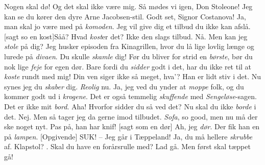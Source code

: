 \documentclass[a4paper,11pt]{article}
\begin{document}
  \begin{sketch}


     Nogen skal dø! Og det skal ikke være mig.
     Så mødes vi igen, Don Stoleone! Jeg kan se du kører den dyre Arne Jacobsen-stil.
     Godt set, Signor Costanova! Ja, man skal jo være med på \emph{komoden}. Jeg vil give dig et tilbud du ikke kan afslå.
    [sagt so en kost]Såå? Hvad \emph{kost}er det?
    Ikke den slags tilbud.
    Nå. Men kan jeg \emph{stole} på dig? Jeg husker episoden fra Kinagrillen, hvor du lå lige lovlig længe og lurede på \emph{divaen}. Du skulle \emph{skamle }dig!
    Før du bliver for strid en \emph{børste}, bør du nok lige \emph{feje} for egen dør.
    Bare fordi du \emph{sidder} godt i det, har du ikke ret til at \emph{koste} rundt med mig!
    Din ven siger ikke så meget, hva’? Han er lidt stiv i det.
    Nu synes jeg du \emph{skaber} dig.
    \emph{Reolig} nu. Ja, jeg ved du ynder at \emph{moppe} folk, og du kommer godt ud i \emph{krogene}.
    Det er også temmelig \emph{skuffende} med \emph{Sengeløse}-sagen.
    Det er ikke mit \emph{bord}.
    Aha! Hvorfor sidder du så ved det?
    Nu skal du ikke \emph{borde} i det.
    Nej. Men så tager jeg da gerne imod tilbudet.
    \emph{Sofa}, so good, men nu må der ske noget nyt.
    Pas på, han har knif!
    [sagt som en dør] Ah, jeg \emph{dør}.
    Der fik han en på \emph{lampen}.
    [Opgivende] SUK! -- Jeg går i Tæppeland!
    Ja, du må hellere \emph{skrubbe} af.
    Klapstol?
    .
    Skal du have en forårsrulle med? 
    Lad gå. Men først skal tæppet gå!


  \end{sketch}
\end{document}
